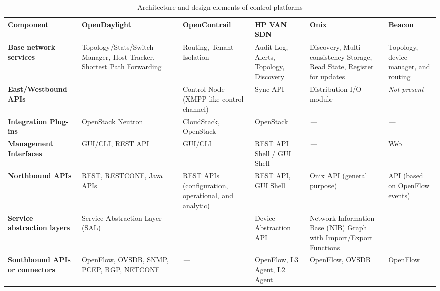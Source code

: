 {\renewcommand{\arraystretch}{1.4}
\begin{table}[!htp]
\caption{Architecture and design elements of control platforms}
\label{tab:controllerdesign}
\begin{center}
\footnotesize
\begin{tabularx}{\textwidth}{|p{1.9cm}|X|X|X|X|X|}
\hline
\textbf{Component} & \textbf{OpenDaylight} & \textbf{OpenContrail} & \textbf{HP VAN SDN} & \textbf{Onix} & \textbf{Beacon} \\\hline

\textbf{Base network services}     & Topology/Stats/Switch Manager, Host Tracker, Shortest Path Forwarding & Routing, Tenant Isolation & Audit Log, Alerts, Topology, Discovery & Discovery, Multi-consistency Storage, Read State, Register for updates  & Topology, device manager, and routing \\\hline

\textbf{East/Westbound APIs}       & \textit{---} & Control Node (XMPP-like control channel) & Sync API & Distribution I/O module & \textit{Not present} \\\hline

\textbf{Integration Plug-ins}  & OpenStack Neutron & CloudStack, OpenStack & OpenStack & \textit{---} & \textit{---} \\\hline

\textbf{Management Interfaces} & GUI/CLI, REST API & GUI/CLI & REST API Shell / GUI Shell & \textit{---} & Web \\\hline

\textbf{Northbound APIs}           & REST, RESTCONF, Java APIs & REST APIs (configuration, operational, and analytic) & REST API, GUI Shell & Onix API (general purpose) & API (based on OpenFlow events) \\\hline

\textbf{Service abstraction layers} & Service Abstraction Layer (SAL) & \textit{---} & Device Abstraction API & Network Information Base (NIB) Graph with Import/Export Functions & \textit{---} \\\hline

\textbf{Southbound APIs or connectors} & OpenFlow, OVSDB, SNMP, PCEP, BGP, NETCONF & \textit{---} & OpenFlow, L3 Agent, L2 Agent & OpenFlow, OVSDB & OpenFlow \\\hline

\end{tabularx}
\end{center}
\end{table}
}


